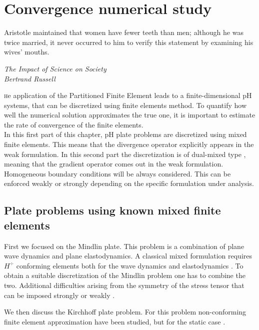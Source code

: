 \chapter{Convergence numerical study}\label{ch:conv}

\epigraph{ Aristotle maintained that women have fewer teeth than men; although he was twice married, it never occurred to him to verify this statement by examining his wives' mouths.}{\textit{The Impact of Science on Society \\ Bertrand Russell}}


\lettrine{\color{theme}{T}}he application of the Partitioned Finite Element leads to a finite-dimensional pH systems, that can be discretized using finite elements method. To quantify how well the numerical solution approximates the true one, it is important to estimate the rate of convergence of the finite elements. \\

In this first part of this chapter, pH plate problems are discretized using mixed finite elements. This means that the divergence operator explicitly appears in the weak formulation.   In this second part the discretization is of dual-mixed type \cite{arnold1990intro}, meaning that the gradient operator comes out in the weak formulation. \\

Homogeneous boundary conditions will be always considered. This can be enforced weakly or strongly depending on the specific formulation under analysis.


\section{Plate problems using known mixed finite elements}

First we focused on the Mindlin plate. This problem is a combination of plane wave dynamics and plane elastodynamics. A classical mixed formulation requires $H^{\div}$ conforming elements both for the wave dynamics \cite{becache2000wave} and elastodynamics \cite{becache2001elas,arnold2014elastodynamics}. To obtain a suitable discretization of the Mindlin problem one has to combine the two. Additional difficulties arising from the symmetry of the stress tensor that can be imposed strongly \cite{becache2001elas} or weakly \cite{arnold2014elastodynamics}.

We then discuss the Kirchhoff plate problem. For this problem non-conforming finite element approximation have been studied, but for the static case \cite{blum1990}. \\

